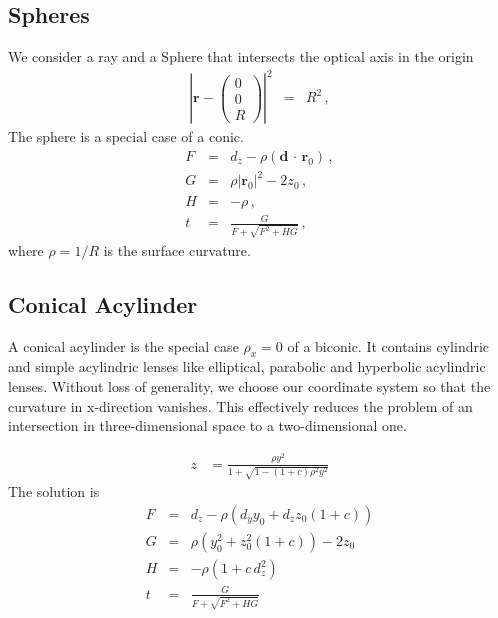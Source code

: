 \documentclass[12pt,a4paper,twoside,openright,BCOR10mm,headsepline,titlepage,abstracton,chapterprefix,final]{scrreprt}
\newcommand\Vector[1]{{\mathbf{#1}}}
\newcommand\Location{\Vector{r}}
\newcommand{\scpm}[2]{(#1\,\cdot\,#2)}
\begin{document}
\subsection{Spheres}
\label{subsection:spheres}

We consider a ray and a Sphere that intersects the optical axis in the origin
\begin{eqnarray}
 \left| \Location - \begin{pmatrix} 0 \\ 0 \\ R \end{pmatrix} \right|^2 &=& R^2\,, \label{eq:sphereeq}
\end{eqnarray}
The sphere is a special case of a conic.
\begin{subequations}
\label{eq:spheresolution}
\begin{eqnarray}
   F &=& d_z - \rho \scpm{\Vector{d}}{\Location_0}\,, \\
   G &=& \rho |\Location_0|^2 - 2 z_0\,, \\
   H &=& - \rho\,, \\
   t &=& \frac{G}{ F + \sqrt{F^2 + H G} }\,, \label{eq:tsolsphere}
\end{eqnarray}
\end{subequations}
where $\rho = 1 / R$ is the surface curvature. 

\subsection{Conical Acylinder}
A conical acylinder is the special case $\rho_x=0$ of a biconic. It contains cylindric and simple acylindric lenses like elliptical, parabolic and hyperbolic acylindric lenses.
Without loss of generality, we choose our coordinate system so that the curvature in x-direction vanishes.
This effectively reduces the problem of an intersection in three-dimensional space to a two-dimensional one.

\begin{align}
 z &= \frac{ \rho y^2}{1 + \sqrt{1 - (1+c) \rho^2 y^2}}
\end{align}
The solution is
\begin{eqnarray}
   F &=& d_z - \rho \left(  d_y y_0 + d_z z_0 (1+c) \right) \\
   G &=& \rho ( y_0^2 + z_0^2 (1+c)) - 2 z_0 \\
   H &=& - \rho ( 1 + c \, d_z^2 ) \\
   t &=& \frac{G}{ F + \sqrt{F^2 + H G} }
\end{eqnarray}
\end{document}
